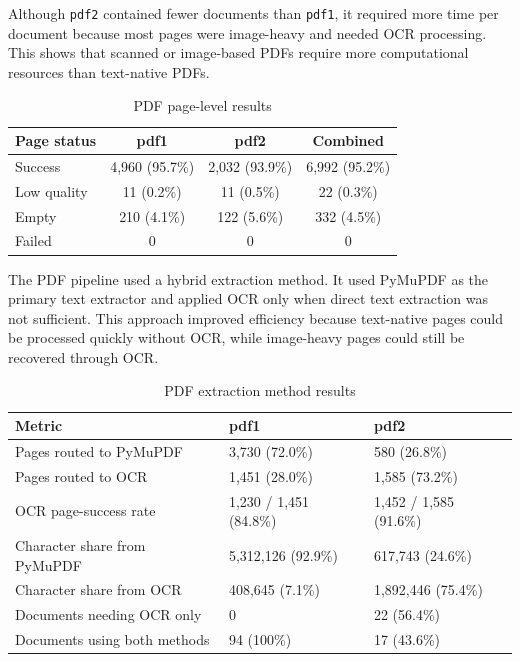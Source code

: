 \documentclass[12pt,oneside,openright,a4paper]{cpe-english-project}
\begin{document}
Although \texttt{pdf2} contained fewer documents than \texttt{pdf1}, it required more time per document because most pages were image-heavy and needed OCR processing. This shows that scanned or image-based PDFs require more computational resources than text-native PDFs.

\begin{table}[H]
\centering
\caption{PDF page-level results}\label{tbl:pdf-page}
\begin{tabular}{|p{}|c|c|c|}
\hline
\textbf{Page status} & \textbf{pdf1} & \textbf{pdf2} & \textbf{Combined} \\ \hline
Success & 4{,}960 (95.7\%) & 2{,}032 (93.9\%) & 6{,}992 (95.2\%) \\ \hline
Low quality & 11 (0.2\%) & 11 (0.5\%) & 22 (0.3\%) \\ \hline
Empty & 210 (4.1\%) & 122 (5.6\%) & 332 (4.5\%) \\ \hline
Failed & 0 & 0 & 0 \\ \hline
\end{tabular}
\end{table}

The PDF pipeline used a hybrid extraction method. It used PyMuPDF as the primary text extractor and applied OCR only when direct text extraction was not sufficient. This approach improved efficiency because text-native pages could be processed quickly without OCR, while image-heavy pages could still be recovered through OCR.

\begin{table}[H]
\centering
\caption{PDF extraction method results}\label{tbl:pdf-method}
\begin{tabular}{|p{}|p{}|p{}|}
\hline
\textbf{Metric} & \textbf{pdf1} & \textbf{pdf2} \\ \hline
Pages routed to PyMuPDF & 3{,}730 (72.0\%) & 580 (26.8\%) \\ \hline
Pages routed to OCR & 1{,}451 (28.0\%) & 1{,}585 (73.2\%) \\ \hline
OCR page-success rate & 1{,}230 / 1{,}451 (84.8\%) & 1{,}452 / 1{,}585 (91.6\%) \\ \hline
Character share from PyMuPDF & 5{,}312{,}126 (92.9\%) & 617{,}743 (24.6\%) \\ \hline
Character share from OCR & 408{,}645 (7.1\%) & 1{,}892{,}446 (75.4\%) \\ \hline
Documents needing OCR only & 0 & 22 (56.4\%) \\ \hline
Documents using both methods & 94 (100\%) & 17 (43.6\%) \\ \hline
\end{tabular}
\end{table}
\end{document}
